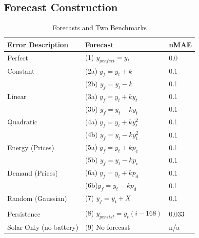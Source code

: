 \documentclass[conference]{IEEEtran}
\begin{document}
\subsection{Forecast Construction}

\begin{table}
    \centering
    \caption{Forecasts and Two Benchmarks}
    \label{tab:forecasts}
    \setlength{\tabcolsep}{3pt}
    \begin{tabular}{l l l}
        \hline
        Error Description       & Forecast                    & nMAE  \\
        \hline
        \hline
        Perfect                 & (1) \(y_{perfect} = y_t\)           & 0.0    \\
        \hline
        Constant                & (2a) \(y_f = y_t + k\)      & 0.1   \\
                                & (2b) \(y_f = y_t - k\)      & 0.1   \\
        \hline
        Linear                  & (3a) \(y_f = y_t + ky_t\)   & 0.1   \\
                                & (3b) \(y_f = y_t - ky_t\)   & 0.1   \\
        \hline
        Quadratic               & (4a) \(y_f = y_t + ky_t^2\) & 0.1   \\
                                & (4b) \(y_f = y_t - ky_t^2\) & 0.1   \\
        \hline
        Energy (Prices)         & (5a) \(y_f = y_t + kp_e\)   & 0.1   \\
                                & (5b) \(y_f = y_t - kp_e\)   & 0.1   \\
        \hline
        Demand (Prices)         & (6a) \(y_f = y_t + kp_d\)   & 0.1   \\
                                & (6b)\(y_f = y_t - kp_d\)    & 0.1   \\
        \hline
        Random (Gaussian)       & (7) \(y_f = y_t + X\)       & 0.1   \\
        \\
        \hline
        Persistence             & (8) \(y_{persist} = y_t(i-168)\)    & 0.033 \\
        \hline
        \hline
        Solar Only (no battery) & (9) No forecast             & n/a   \\
        \hline
    \end{tabular}
\end{table}
\end{document}
